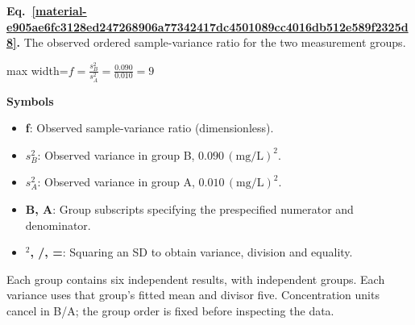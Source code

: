 \documentclass[11pt,a4paper]{article}
\begin{document}
\par\medskip
\noindent\begin{minipage}{\linewidth}
\label{material-e905ae6fc3128ed247268906a77342417dc4501089cc4016db512e589f2325d8}
\noindent\textbf{Eq.~\ref*{material-e905ae6fc3128ed247268906a77342417dc4501089cc4016db512e589f2325d8}.} The observed ordered sample-variance ratio for the two measurement groups.\par\nopagebreak
\begin{center}\begin{adjustbox}{max width=\linewidth}$\displaystyle f=\frac{s_B^2}{s_A^2}=\frac{0.090}{0.010}=9$\end{adjustbox}\end{center}

\par\noindent\textbf{Symbols}

\begin{itemize}\setlength{\itemsep}{1pt}\setlength{\parsep}{0pt}
\item \textbf{f}: Observed sample-variance ratio (dimensionless).
\item \textbf{\(s_B^2\)}: Observed variance in group B, \(0.090\,\mathrm{(mg/L)^2}\).
\item \textbf{\(s_A^2\)}: Observed variance in group A, \(0.010\,\mathrm{(mg/L)^2}\).
\item \textbf{B, A}: Group subscripts specifying the prespecified numerator and denominator.
\item \textbf{\ensuremath{{}^2}, /, =}: Squaring an SD to obtain variance, division and equality.
\end{itemize}

Each group contains six independent results, with independent groups. Each variance uses that group's fitted mean and divisor five. Concentration units cancel in B/A; the group order is fixed before inspecting the data.

\end{minipage}\par
\medskip
\end{document}
